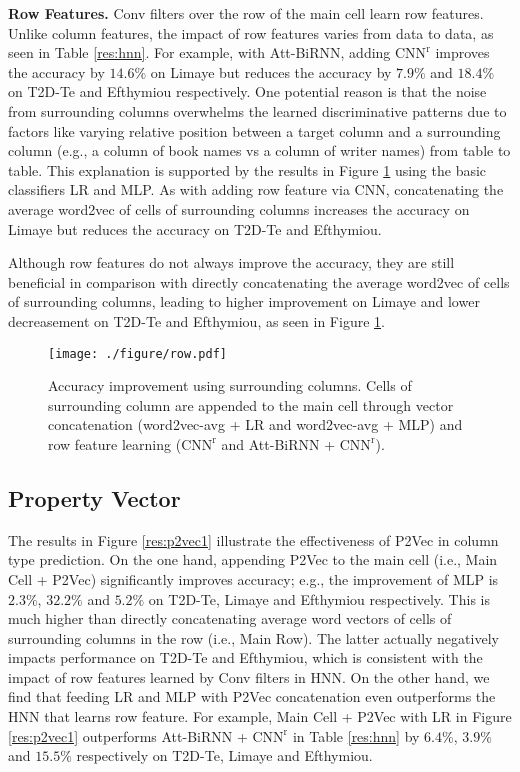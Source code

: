 \documentclass{article}
\begin{document}
\vspace{0.1cm}
\noindent \textbf{Row Features.}
Conv filters over the row of the main cell learn row features.
Unlike column features, the impact of row features varies from data to data, as seen in Table \ref{res:hnn}.
For example, with Att-BiRNN,
adding $\text{CNN}^{\text{r}}$ improves the accuracy by $14.6\%$ on Limaye 
but reduces the accuracy by $7.9\%$ and $18.4\%$ on T2D-Te and Efthymiou respectively.
One potential reason is that the noise from surrounding columns overwhelms the learned discriminative patterns 
due to factors like varying relative position between a target column and a surrounding column (e.g., a column of book names vs a column of writer names) from table to table.
This explanation is supported by the results in Figure \ref{res:row} using the basic classifiers LR and MLP.
As with adding row feature via CNN, 
concatenating the average word2vec of cells of surrounding columns increases the accuracy on Limaye but reduces the accuracy on T2D-Te and Efthymiou.

Although row features do not always improve the accuracy, they are still beneficial in comparison with directly concatenating the average word2vec of cells of surrounding columns, leading to higher improvement on Limaye and lower decreasement on T2D-Te and Efthymiou, as seen in Figure \ref{res:row}.




\vspace{-0.15cm}
\begin{figure}[h]
\centering
\texttt{[image: ./figure/row.pdf]}
\vspace{-0.7cm}
\caption{\footnotesize
Accuracy improvement using surrounding columns.
Cells of surrounding column are appended to the main cell through vector concatenation (word2vec-avg + LR and word2vec-avg + MLP) and row feature learning ($\text{CNN}^{\text{r}}$ and Att-BiRNN + $\text{CNN}^{\text{r}}$).
}
\label{res:row}
\end{figure}
\vspace{-0.1cm}

\subsection{Property Vector}
The results in Figure \ref{res:p2vec1} illustrate the effectiveness of P2Vec in column type prediction.
On the one hand, appending P2Vec to the main cell (i.e., Main Cell + P2Vec) significantly improves accuracy; e.g., the improvement of MLP is $2.3\%$, $32.2\%$ and $5.2\%$ on T2D-Te, Limaye and Efthymiou respectively.
This is much higher than directly concatenating average word vectors of cells of surrounding columns in the row (i.e., Main Row).
The latter actually negatively impacts performance on T2D-Te and Efthymiou,
which is consistent with the impact of row features learned by Conv filters in HNN.
On the other hand, we find that feeding LR and MLP with P2Vec concatenation even outperforms the HNN that learns row feature.
For example, Main Cell + P2Vec with LR in Figure \ref{res:p2vec1} outperforms Att-BiRNN + $\text{CNN}^{\text{r}}$ in Table \ref{res:hnn} by $6.4\%$, $3.9\%$ and $15.5\%$ respectively on T2D-Te, Limaye and Efthymiou.
\end{document}
